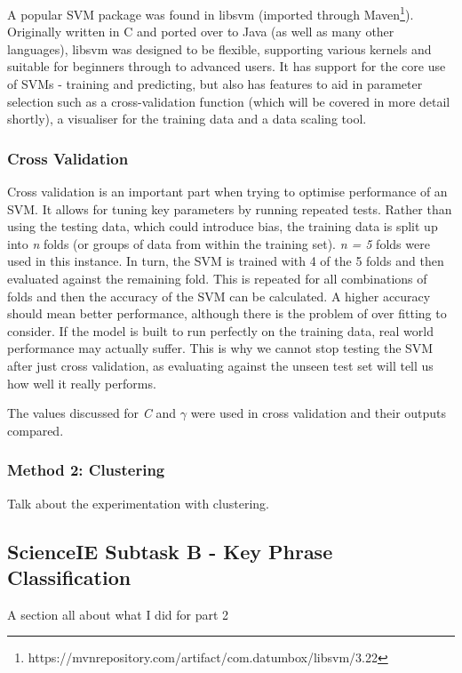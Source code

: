 A popular SVM package was found in libsvm (imported through Maven\footnote{https://mvnrepository.com/artifact/com.datumbox/libsvm/3.22}). Originally written in C and ported over to Java (as well as many other languages), libsvm was designed to be flexible, supporting various kernels and suitable for beginners through to advanced users. It has support for the core use of SVMs - training and predicting, but also has features to aid in parameter selection such as a cross-validation function (which will be covered in more detail shortly), a visualiser for the training data and a data scaling tool.


\subsubsection*{Cross Validation}
Cross validation is an important part when trying to optimise performance of an SVM. It allows for tuning key parameters by running repeated tests. Rather than using the testing data, which could introduce bias, the training data is split up into \textit{n} folds (or groups of data from within the training set). \textit{n = 5} folds were used in this instance. In turn, the SVM is trained with 4 of the 5 folds and then evaluated against the remaining fold. This is repeated for all combinations of folds and then the accuracy of the SVM can be calculated. A higher accuracy should mean better performance, although there is the problem of over fitting to consider. If the model is built to run perfectly on the training data, real world performance may actually suffer. This is why we cannot stop testing the SVM after just cross validation, as evaluating against the unseen test set will tell us how well it really performs. 

The values discussed for \textit{C} and $\gamma$ were used in cross validation and their outputs compared. %

\subsubsection{Method 2: Clustering}
Talk about the experimentation with clustering.

\subsection{ScienceIE Subtask B - Key Phrase Classification}
A section all about what I did for part 2

